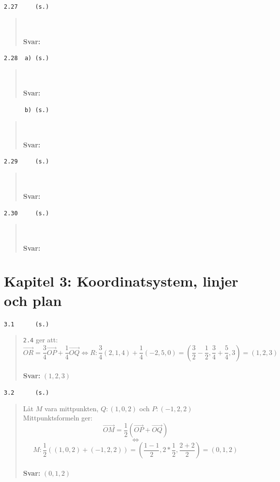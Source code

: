 \documentclass[a4paper]{article}
\newcommand{\tskcol}[1]{\textcolor{tskcol}{#1}}
\newcommand{\vek}[1]{\overrightarrow{#1}}
\begin{document}
\texttt{\tskcol{2.27~~~~ (s.)}}
\begin{quotation}
	\noindent
	\\ \\
	\textbf{Svar:}
\end{quotation}

\texttt{\tskcol{2.28~~a) (s.)}}
\begin{quotation}
	\noindent
	\\ \\
	\textbf{Svar:}
\end{quotation}

\texttt{\tskcol{~~~~~~b) (s.)}}
\begin{quotation}
	\noindent
	\\ \\
	\textbf{Svar:}
\end{quotation}

\texttt{\tskcol{2.29~~~~ (s.)}}
\begin{quotation}
	\noindent
	\\ \\
	\textbf{Svar:}
\end{quotation}

\texttt{\tskcol{2.30~~~~ (s.)}}
\begin{quotation}
	\noindent
	\\ \\
	\textbf{Svar:}
\end{quotation}

\pagebreak
\section*{Kapitel 3: Koordinatsystem, linjer och plan}
\texttt{\tskcol{3.1~~~~~ (s.)}}
\begin{quotation}
	\noindent
	\texttt{\tskcol{2.4}} ger att:
	\[\vek{OR}=\frac{3}{4}\vek{OP}+\frac{1}{4}\vek{OQ} \Leftrightarrow
	R:\frac{3}{4}(2,1,4)+\frac{1}{4}(-2,5,0)=(\frac{3}{2}-\frac{1}{2},\frac{3}{4}+\frac{5}{4},3)=(1,2,3)\]
	\\
	\textbf{Svar:} $(1,2,3)$
\end{quotation}

\texttt{\tskcol{3.2~~~~~ (s.)}}
\begin{quotation}
	\noindent
	Låt $M$ vara mittpunkten, $Q:(1,0,2)$ och $P:(-1,2,2)$
	Mittpunktsformeln ger:
	\[\vek{OM}=\frac{1}{2}(\vek{OP}+\vek{OQ})\] 
	\[\Leftrightarrow\]
	\[M:\frac{1}{2}((1,0,2)+(-1,2,2))=
	(\frac{1-1}{2},2*\frac{1}{2},\frac{2+2}{2})=
	(0,1,2)\]
	\\
	\textbf{Svar:} $(0,1,2)$
\end{quotation}
\end{document}
